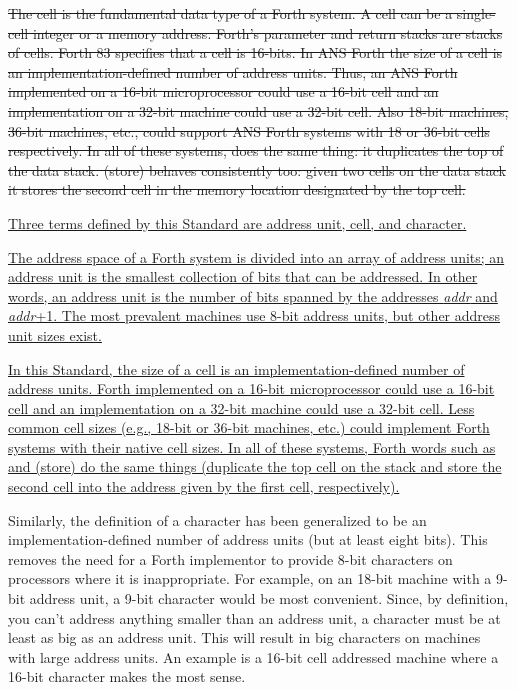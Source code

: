 \sout{%
The cell is the fundamental data type of a Forth system. A cell can
be a single-cell integer or a memory address. Forth's parameter and
return stacks are stacks of cells. Forth 83 specifies that a cell is
16-bits. In ANS Forth the size of a cell is an implementation-defined
number of address units. Thus, an ANS Forth implemented on a 16-bit
microprocessor could use a 16-bit cell and an implementation on a
32-bit machine could use a 32-bit cell. Also 18-bit machines, 36-bit
machines, etc., could support ANS Forth systems with 18 or 36-bit
cells respectively. In all of these systems,  does the same
thing: it duplicates the top of the data stack. \word{!} (store)
behaves consistently too: given two cells on the data stack it
stores the second cell in the memory location designated by the
top cell.}

\uline{%
Three terms defined by this Standard are address unit, cell, and
character.}

\uline{%
The address space of a Forth system is divided into an array of
address units; an address unit is the smallest collection of bits that
can be addressed. In other words, an address unit is the number of
bits spanned by the addresses \emph{addr} and \emph{addr}+1.
The most prevalent machines use 8-bit address units, but other
address unit sizes exist.}

\uline{%
In this Standard, the size of a cell is an implementation-defined
number of address units. Forth implemented on a 16-bit microprocessor
could use a 16-bit cell and an implementation on a 32-bit machine
could use a 32-bit cell. Less common cell sizes (e.g., 18-bit or
36-bit machines, etc.) could implement Forth systems with their native
cell sizes. In all of these systems, Forth words such as  and
\word{!} (store) do the same things (duplicate the top cell on the stack
and store the second cell into the address given by the first cell,
respectively).}

Similarly, the definition of a character has been generalized to be
an implementation-defined number of address units (but at least eight
bits). This removes the need for a Forth implementor to provide 8-bit
characters on processors where it is inappropriate. For example, on
an 18-bit machine with a 9-bit address unit, a 9-bit character would
be most convenient. Since, by definition, you can't address anything
smaller than an address unit, a character must be at least as big as
an address unit. This will result in big characters on machines with
large address units. An example is a 16-bit cell addressed machine
where a 16-bit character makes the most sense.

